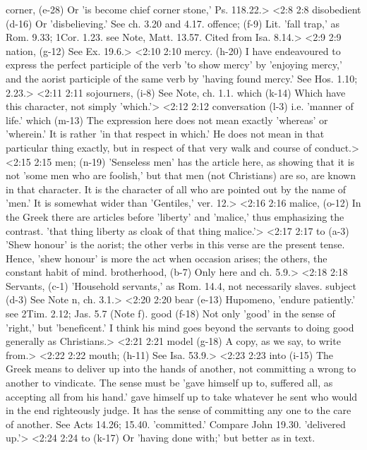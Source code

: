   corner, (e-28)  Or 'is become chief corner stone,' Ps. 118.22.>
<2:8 2:8  disobedient (d-16)  Or 'disbelieving.' See ch. 3.20 and 4.17.
  offence; (f-9)  Lit. 'fall trap,' as Rom. 9.33; 1Cor. 1.23. see Note, Matt. 13.57. Cited from Isa. 8.14.>
<2:9 2:9  nation, (g-12)  See Ex. 19.6.>
<2:10 2:10  mercy. (h-20)  I have endeavoured to express the perfect participle of the  verb 'to show mercy' by 'enjoying mercy,' and the aorist  participle of the same verb by 'having found mercy.' See Hos.  1.10; 2.23.>
<2:11 2:11  sojourners, (i-8)  See Note, ch. 1.1.
  which (k-14)  Which have this character, not simply 'which.'>
<2:12 2:12  conversation (l-3)  i.e. 'manner of life.'
  which (m-13)  The expression here does not mean exactly 'whereas' or  'wherein.' It is rather 'in that respect in which.' He does not  mean in that particular thing exactly, but in respect of that  very walk and course of conduct.>
<2:15 2:15  men; (n-19)  'Senseless men' has the article here, as showing that it is  not 'some men who are foolish,' but that men (not Christians)  are so, are known in that character. It is the character of all  who are pointed out by the name of 'men.' It is somewhat wider  than 'Gentiles,' ver. 12.>
<2:16 2:16  malice, (o-12)  In the Greek there are articles before 'liberty' and  'malice,' thus emphasizing the contrast. 'that thing liberty as  cloak of that thing malice.'>
<2:17 2:17  to (a-3)  'Shew honour' is the aorist; the other verbs in this verse  are the present tense. Hence, 'shew honour' is more the act  when occasion arises; the others, the constant habit of mind.
  brotherhood, (b-7)  Only here and ch. 5.9.>
<2:18 2:18  Servants, (c-1)  'Household servants,' as Rom. 14.4, not necessarily slaves.
  subject (d-3)  See Note n, ch. 3.1.>
<2:20 2:20  bear (e-13)  Hupomeno, 'endure patiently.' see 2Tim. 2.12; Jas. 5.7  (Note f).
  good (f-18)  Not only 'good' in the sense of 'right,' but 'beneficent.' I  think his mind goes beyond the servants to doing good generally  as Christians.>
<2:21 2:21  model (g-18)  A copy, as we say, to write from.>
<2:22 2:22  mouth; (h-11)  See Isa. 53.9.>
<2:23 2:23  into (i-15)  The Greek means to deliver up into the hands of another, not  committing a wrong to another to vindicate. The sense must be  'gave himself up to, suffered all, as accepting all from his  hand.' gave himself up to take whatever he sent who would in  the end righteously judge. It has the sense of committing any  one to the care of another. See Acts 14.26; 15.40. 'committed.'  Compare John 19.30. 'delivered up.'>
<2:24 2:24  to (k-17)  Or 'having done with;' but better as in text.
